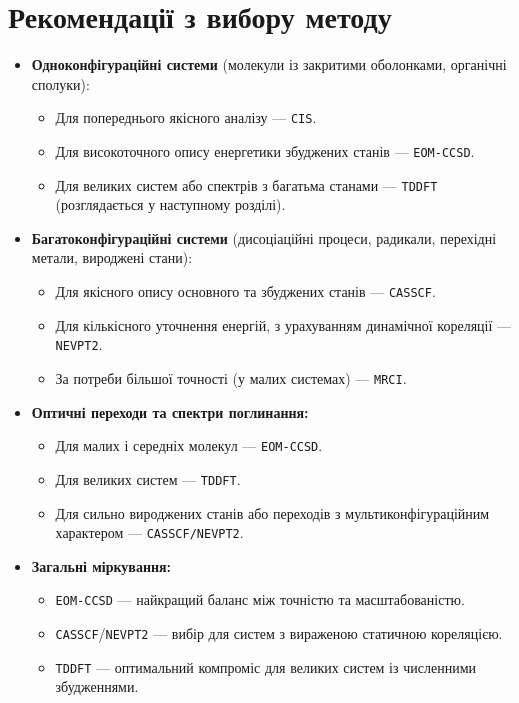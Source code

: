 \section{Рекомендації з вибору методу}

\begin{itemize}
    \item \textbf{Одноконфігураційні системи}
          (молекули із закритими оболонками, органічні сполуки):
          \begin{itemize}
              \item Для попереднього якісного аналізу --- \texttt{CIS}.
              \item Для високоточного опису енергетики збуджених станів --- \texttt{EOM-CCSD}.
              \item Для великих систем або спектрів з багатьма станами --- \texttt{TDDFT}
                    (розглядається у наступному розділі).
          \end{itemize}

    \item \textbf{Багатоконфігураційні системи}
          (дисоціаційні процеси, радикали, перехідні метали, вироджені стани):
          \begin{itemize}
              \item Для якісного опису основного та збуджених станів --- \texttt{CASSCF}.
              \item Для кількісного уточнення енергій, з урахуванням динамічної кореляції --- \texttt{NEVPT2}.
              \item За потреби більшої точності (у малих системах) --- \texttt{MRCI}.
          \end{itemize}

    \item \textbf{Оптичні переходи та спектри поглинання:}
          \begin{itemize}
              \item Для малих і середніх молекул --- \texttt{EOM-CCSD}.
              \item Для великих систем --- \texttt{TDDFT}.
              \item Для сильно вироджених станів або переходів з мультиконфігураційним характером --- \texttt{CASSCF/NEVPT2}.
          \end{itemize}

    \item \textbf{Загальні міркування:}
          \begin{itemize}
              \item \texttt{EOM-CCSD} --- найкращий баланс між точністю та масштабованістю.
              \item \texttt{CASSCF}/\texttt{NEVPT2} --- вибір для систем з вираженою статичною кореляцією.
              \item \texttt{TDDFT} --- оптимальний компроміс для великих систем із численними збудженнями.
          \end{itemize}
\end{itemize}

